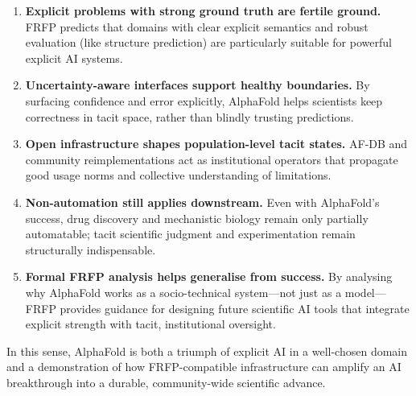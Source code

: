 \begin{enumerate}
  \item \textbf{Explicit problems with strong ground truth are fertile ground.}
        FRFP predicts that domains with clear explicit semantics and robust
        evaluation (like structure prediction) are particularly suitable for
        powerful explicit AI systems.

  \item \textbf{Uncertainty-aware interfaces support healthy boundaries.}
        By surfacing confidence and error explicitly, AlphaFold helps
        scientists keep correctness in tacit space, rather than blindly
        trusting predictions.

  \item \textbf{Open infrastructure shapes population-level tacit states.}
        AF-DB and community reimplementations act as institutional operators
        that propagate good usage norms and collective understanding of
        limitations.

  \item \textbf{Non-automation still applies downstream.}
        Even with AlphaFold’s success, drug discovery and mechanistic biology
        remain only partially automatable; tacit scientific judgment and
        experimentation remain structurally indispensable.

  \item \textbf{Formal FRFP analysis helps generalise from success.}
        By analysing why AlphaFold works as a socio-technical system---not just
        as a model---FRFP provides guidance for designing future scientific AI
        tools that integrate explicit strength with tacit, institutional
        oversight.
\end{enumerate}

In this sense, AlphaFold is both a triumph of explicit AI in a well-chosen
domain and a demonstration of how FRFP-compatible infrastructure can amplify
an AI breakthrough into a durable, community-wide scientific advance.
